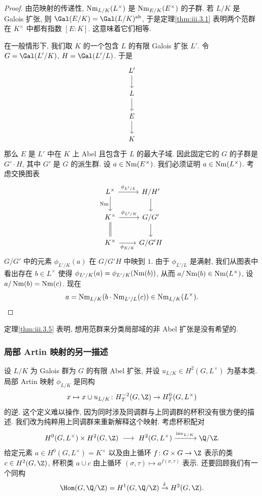 \begin{proof}
由范映射的传递性, $\operatorname{Nm}_{L/K}(L^\times)$ 是 $\operatorname{Nm}_{E/K}(E^\times)$ 的子群. 若 $L/K$ 是 Galois 扩张, 则 $\Gal(E/K)=\Gal(L/K)^{\mathrm{ab}}$, 于是定理\ref{thm:iii.3.1} 表明两个范群在 $K^\times$ 中都有指数 $[E:K]$. 这意味着它们相等.

在一般情形下, 我们取 $K$ 的一个包含 $L$ 的有限 Galois 扩张 $L'$. 令 $G=\Gal(L'/K)$, $H=\Gal(L'/L)$. 于是
\[
\begin{tikzcd}
	{L'} \\
	L \\
	E \\
	K
	\arrow[from=1-1, to=2-1]
	\arrow[from=2-1, to=3-1]
	\arrow[from=3-1, to=4-1]
\end{tikzcd}
\]
那么 $E$ 是 $L'$ 中在 $K$ 上 Abel 且包含于 $L$ 的最大子域. 因此固定它的 $G$ 的子群是 $G'\cdot H$, 其中 $G'$ 是 $G$ 的派生群. 设 $a\in\operatorname{Nm}(E^\times)$. 我们必须证明 $a\in\operatorname{Nm}(L^\times)$. 考虑交换图表
\[
\begin{tikzcd}
	{L^\times} & {H/H'} \\
	{K^\times} & {G/G'} \\
	{K^\times} & {G/G'H}
	\arrow["{\phi_{L'/L}}", from=1-1, to=1-2]
	\arrow["\Nm"', from=1-1, to=2-1]
	\arrow[from=1-2, to=2-2]
	\arrow["{\phi_{L'/K}}", from=2-1, to=2-2]
	\arrow[equal, from=2-1, to=3-1]
	\arrow[from=2-2, to=3-2]
	\arrow["{\phi_{E/K}}"', from=3-1, to=3-2]
\end{tikzcd}
\]
$G/G'$ 中的元素 $\phi_{L'/K}(a)$ 在 $G/G'H$ 中映到 $1$. 由于 $\phi_{L'/L}$ 是满射, 我们从图表中看出存在 $b\in L^\times$ 使得 $\phi_{L'/K}(a)=\phi_{L'/K}(\operatorname{Nm}(b))$, 从而 $a/\operatorname{Nm}(b)\in\operatorname{Nm}(L^\times)$, 设 $a/\operatorname{Nm}(b)=\operatorname{Nm}(c)$. 现在
\[
 a=\operatorname{Nm}_{L/K}(b\cdot\operatorname{Nm}_{L'/L}(c))\in\operatorname{Nm}_{L/K}(L^\times).
\]
\end{proof}

定理\ref{thm:iii.3.5} 表明, 想用范群来分类局部域的非 Abel 扩张是没有希望的.

\subsubsection*{局部 Artin 映射的另一描述}

设 $L/K$ 为 Galois 群为 $G$ 的有限 Abel 扩张, 并设 $u_{L/K}\in H^2(G,L^\times)$ 为基本类. 局部 Artin 映射 $\phi_{L/K}$ 是同构
\[
 x\mapsto x\cup u_{L/K}\colon H_T^{-2}(G,\Z)\to H_T^0(G,L^\times)
\]
的逆. 这个定义难以操作, 因为同时涉及同调群与上同调群的杯积没有很方便的描述. 我们改为纯粹用上同调群来重新解释这个映射. 考虑杯积配对
\[
 H^0(G,L^\times)\times H^2(G,\Z)\ \longrightarrow\ H^2(G,L^\times)\xrightarrow{\inv_{L/K}}\Q/\Z.
\]
给定元素 $a\in H^0(G,L^\times)=K^\times$ 以及由上循环 $f\colon G\times G\to\Z$ 表示的类 $c\in H^2(G,\Z)$, 杯积类 $a\cup c$ 由上循环 $(\sigma,\tau)\mapsto a^{f(\sigma,\tau)}$ 表示. 还要回顾我们有一个同构
\[
 \Hom(G,\Q/\Z)=H^1(G,\Q/\Z)\xrightarrow{\delta}H^2(G,\Z).
\]

